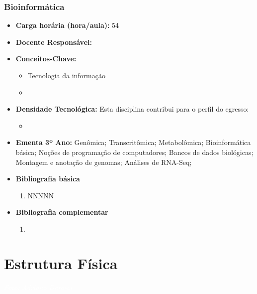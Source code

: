 \documentclass[11pt,fleqn]{book} %
\begin{document}
\subsection{Bioinformática}\label{disc:bioinfo}
\begin{itemize}
	\item \textbf{Carga horária (hora/aula):} 54
	\item \textbf{Docente Responsável:}
	\item \textbf{Conceitos-Chave:}
	\begin{itemize}
		\item Tecnologia da informação
		\item 
	\end{itemize}
	\item \textbf{Densidade Tecnológica:} Esta disciplina contribui para o perfil do egresso:
	\begin{itemize}
		\item 
	\end{itemize}
	\item \textbf{Ementa 3º Ano:}		
	Genômica;
	Transcritômica;
	Metabolômica;
	Bioinformática básica;
	Noções de programação de computadores;
	Bancos de dados biológicas;
	Montagem e anotação de genomas;
	Análises de RNA-Seq;	
	
	\item \textbf{Bibliografia básica}
	\begin{enumerate}
		\item NNNNN
	\end{enumerate}
	\item \textbf{Bibliografia complementar}
	\begin{enumerate}
		\item 
	\end{enumerate}	
\end{itemize}


\chapter{Estrutura Física}
\vspace{6em}
\begin{flushright}
	\textit{\textcolor{white}{Foto: Adriano Darosci}}
\end{flushright}
\vspace{12em}
\end{document}

